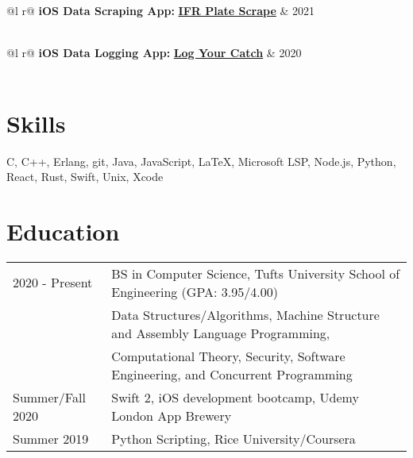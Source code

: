 \documentclass[letter,10pt]{article}
\begin{document}
\begin{tabularx}{\linewidth}{ @{}l r@{} }
    \textbf{iOS Data Scraping App:} \href{https://github.com/liam-strand/IFR-Plate-Scrape}{\textbf{IFR Plate Scrape}} & \hfill 2021 \\[3.75pt]
     \\[3.75pt]
\end{tabularx}

\begin{tabularx}{\linewidth}{ @{}l r@{} }
    \textbf{iOS Data Logging App:} \href{https://github.com/bstrand42/Log-Your-Catch}{\textbf{Log Your Catch}} & \hfill 2020 \\[3.75pt]
     \\[3.75pt]
\end{tabularx}

\section{Skills}
\normalsize{C, C++, Erlang, git, Java, JavaScript, \LaTeX, Microsoft LSP, Node.js, Python, React, Rust, Swift, Unix, Xcode}

\section{Education}
\begin{tabularx}{\linewidth}{@{}l X@{}}	
2020 - Present & BS in Computer Science, Tufts University School of Engineering \hfill \normalsize (GPA: 3.95/4.00) \\
    & \footnotesize{Data Structures/Algorithms, Machine Structure and Assembly Language Programming,} \\
    & \footnotesize{Computational Theory, Security, Software Engineering, and Concurrent Programming} \\[3.75pt]
Summer/Fall 2020 & Swift 2, iOS development bootcamp, Udemy London App Brewery \\[3.75pt]
Summer 2019 & Python Scripting, Rice University/Coursera	
\end{tabularx}
\end{document}
